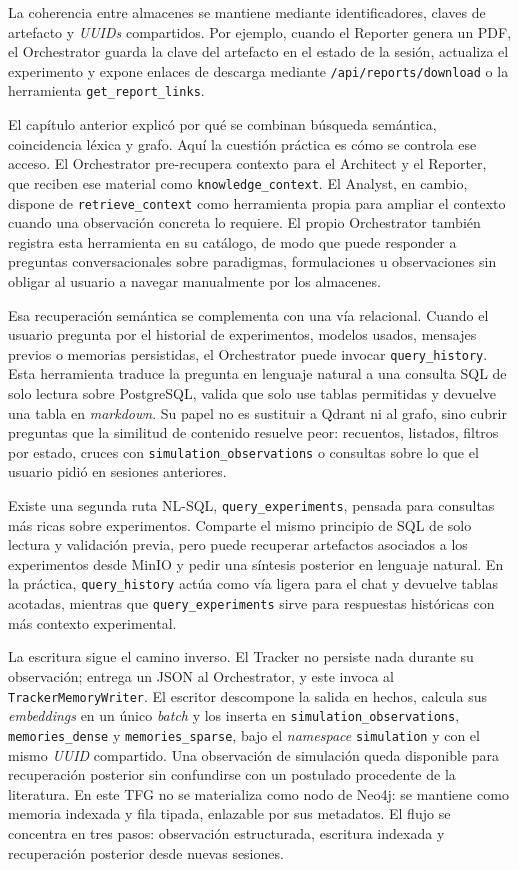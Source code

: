 La coherencia entre almacenes se mantiene mediante identificadores, claves de
artefacto y \textit{UUIDs} compartidos. Por ejemplo, cuando el Reporter genera
un PDF, el Orchestrator guarda la clave del artefacto en el estado de la
sesión, actualiza el experimento y expone enlaces de descarga mediante
\texttt{/api/reports/download} o la herramienta \texttt{get\_report\_links}.

El capítulo anterior explicó por qué se combinan búsqueda semántica,
coincidencia léxica y grafo. Aquí la cuestión práctica es cómo se controla
ese acceso. El Orchestrator pre-recupera contexto para el Architect
y el Reporter, que reciben ese material como \texttt{knowledge\_context}. El
Analyst, en cambio, dispone de \texttt{retrieve\_context} como herramienta
propia para ampliar el contexto cuando una observación concreta lo requiere.
El propio Orchestrator también registra esta herramienta en su catálogo, de
modo que puede responder a preguntas conversacionales sobre paradigmas,
formulaciones u observaciones sin obligar al usuario a navegar manualmente
por los almacenes.

Esa recuperación semántica se complementa con una vía relacional. Cuando el
usuario pregunta por el historial de experimentos, modelos usados, mensajes
previos o memorias persistidas, el Orchestrator puede invocar
\texttt{query\_history}. Esta herramienta traduce la pregunta en lenguaje
natural a una consulta SQL de solo lectura sobre PostgreSQL, valida que solo
use tablas permitidas y devuelve una tabla en \textit{markdown}. Su papel no
es sustituir a Qdrant ni al grafo, sino cubrir preguntas que la similitud de
contenido resuelve peor: recuentos, listados, filtros por estado, cruces con
\texttt{simulation\_observations} o consultas sobre lo que el usuario pidió
en sesiones anteriores.

Existe una segunda ruta NL-SQL, \texttt{query\_experiments}, pensada para
consultas más ricas sobre experimentos. Comparte el mismo principio de SQL de
solo lectura y validación previa, pero puede recuperar artefactos asociados a
los experimentos desde MinIO y pedir una síntesis posterior en lenguaje natural.
En la práctica, \texttt{query\_history} actúa como vía ligera para el chat y
devuelve tablas acotadas, mientras que \texttt{query\_experiments} sirve para
respuestas históricas con más contexto experimental.

La escritura sigue el camino inverso. El Tracker no persiste nada durante su
observación; entrega un JSON al Orchestrator, y este invoca al
\texttt{TrackerMemoryWriter}. El escritor descompone la salida en hechos,
calcula sus \textit{embeddings} en un único \textit{batch} y los inserta en
\texttt{simulation\_observations}, \texttt{memories\_dense} y
\texttt{memories\_sparse}, bajo el \textit{namespace} \texttt{simulation} y
con el mismo \textit{UUID} compartido. Una observación de simulación queda
disponible para recuperación posterior sin confundirse con un postulado
procedente de la literatura. En este TFG no se materializa como nodo de Neo4j:
se mantiene como memoria indexada y fila tipada, enlazable por sus metadatos.
El flujo se concentra en tres pasos: observación estructurada, escritura
indexada y recuperación posterior desde nuevas sesiones.

